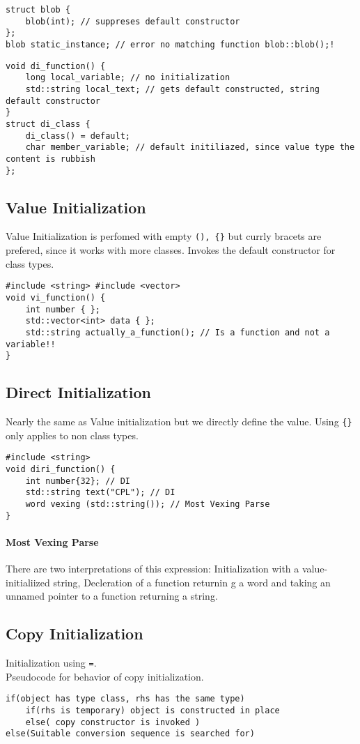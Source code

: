 \begin{lstlisting}
struct blob {
	blob(int); // suppreses default constructor
};
blob static_instance; // error no matching function blob::blob();!
\end{lstlisting}

\begin{lstlisting}
void di_function() {
	long local_variable; // no initialization
	std::string local_text; // gets default constructed, string default constructor
}
struct di_class {
	di_class() = default;
	char member_variable; // default initiliazed, since value type the content is rubbish
};
\end{lstlisting}

\subsection{Value Initialization}
Value Initialization is perfomed with empty \lstinline|(), {}| but currly bracets are prefered, since it works with more classes. Invokes the default constructor for class types.

\begin{lstlisting}
#include <string> #include <vector>
void vi_function() {
	int number { };
	std::vector<int> data { };
	std::string actually_a_function(); // Is a function and not a variable!!
}
\end{lstlisting}

\subsection{Direct Initialization}
Nearly the same as Value initialization but we directly define the value. Using \lstinline|{}| only applies to non class types.

\begin{lstlisting}
#include <string>
void diri_function() {
	int number{32}; // DI
	std::string text("CPL"); // DI
	word vexing (std::string()); // Most Vexing Parse
}
\end{lstlisting}

\paragraph{Most Vexing Parse}
There are two interpretations of this expression: Initialization with a value-initialiized string, Decleration of a function returnin g a word and taking an unnamed pointer to a function returning a string.


\subsection{Copy Initialization}
Initialization using \lstinline|=|. \\
Pseudocode for behavior of copy initialization.
\begin{lstlisting}
if(object has type class, rhs has the same type)
	if(rhs is temporary) object is constructed in place
	else( copy constructor is invoked )
else(Suitable conversion sequence is searched for)
\end{lstlisting}

